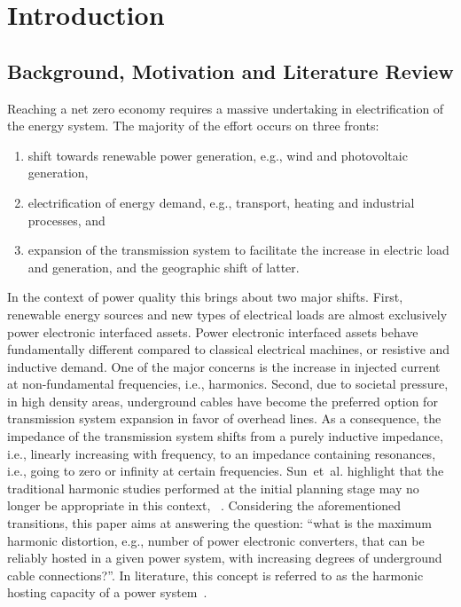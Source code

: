 \section{Introduction}
\label{sec:introduction}

\subsection{Background, Motivation and Literature Review}
\label{sec:background_and_motivation}

Reaching a net zero economy requires a massive undertaking in electrification of the energy system. The majority of the effort occurs on three fronts:
\begin{enumerate}
    \item shift towards renewable power generation, e.g., wind and photovoltaic generation, 
    \item electrification of energy demand, e.g., transport, heating and industrial processes, and
    \item expansion of the transmission system to facilitate the increase in electric load and generation, and the geographic shift of latter.
\end{enumerate}

In the context of power quality this brings about two major shifts. First, renewable energy sources and new types of electrical loads are almost exclusively power electronic interfaced assets. Power electronic interfaced assets behave fundamentally different compared to classical electrical machines, or resistive and inductive demand. One of the major concerns is the increase in injected current at non-fundamental frequencies, i.e., harmonics. Second, due to societal pressure, in high density areas, underground cables have become the preferred option for transmission system expansion in favor of overhead lines. As a consequence, the impedance of the transmission system shifts from a purely inductive impedance, i.e., linearly increasing with frequency, to an impedance containing resonances, i.e., going to zero or infinity at certain frequencies. Sun~et~al. highlight that the traditional harmonic studies performed at the initial planning stage may no longer be appropriate in this context, ~\cite{sun_distribution_2022}. Considering the aforementioned transitions, this paper aims at answering the question: “what is the maximum harmonic distortion, e.g., number of power electronic converters, that can be reliably hosted in a given power system, with increasing degrees of underground cable connections?”. In literature, this concept is referred to as the harmonic hosting capacity of a power system~\cite{bollen_hosting_2017,koirala_hosting_2022}. 

